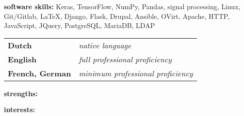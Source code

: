 




\divider

\textbf{software skills:}
Keras,
TensorFlow,
NumPy,
Pandas,
signal processing,
Linux,
Git/Gitlab,
\LaTeX,
Django,
Flask,
Drupal,
Ansible,
OVirt,
Apache,
HTTP,
JavaScript,
JQuery,
PostgreSQL,
MariaDB,
LDAP

\divider

\begin{tabular}{p{2.5cm} p{4cm}}
\textbf{Dutch} & \textit{native language} \\
\textbf{English} & \textit{full professional proficiency}\\
\textbf{French, German} &\textit{minimum professional \newline proficiency}
\end{tabular}


\textbf{strengths:} \smallskip  \newline
{}

\divider

\textbf{interests:} \smallskip \newline
{}


